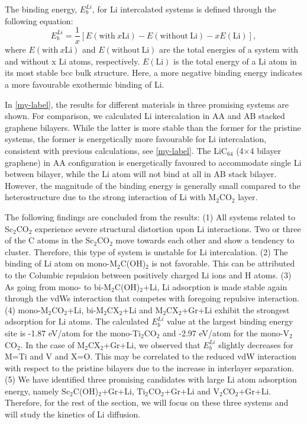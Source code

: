 The binding energy, $E_{b}^{Li}$, for Li intercalated systems is defined through the following equation:
\begin{equation}
E_{b}^{Li}=\frac{1}{x}[E(\mathrm{with~}x\mathrm{Li})-E(\mathrm{without~Li})-xE(\mathrm{Li})],
\end{equation}
where $E(\mathrm{with~}x\mathrm{Li})$ and $E(\mathrm{without~Li})$ are the total energies of a system with and without x Li atoms, respectively. $E(\mathrm{Li})$ is the total energy of a Li atom in its most stable bcc bulk structure. Here, a more negative binding energy indicates a more favourable exothermic binding of Li. 

In \autoref{my-label}, the results for different materials in three promising systems are shown. For comparison, we calculated Li intercalation in AA and AB stacked graphene bilayers. While the latter is more stable than the former for the pristine systems, the former is energetically more favourable for Li intercalation, consistent with previous calculations\cite{PhysRevB.93.245438}, see \autoref{my-label}.  The LiC$_{64}$ (4$\times$4 bilayer graphene) in AA configuration is energetically favoured to accommodate single Li between bilayer, while the Li atom will not bind at all in AB stack bilayer. However, the magnitude of the binding energy is generally small compared to the heterostructure due to the strong interaction of Li with M$_2$CO$_2$ layer.


The following findings are concluded from the results: 
(1) All systems related to Sc$_2$CO$_2$ experience severe structural distortion upon Li interactions. Two or three of the C atoms in the Sc$_2$CO$_2$ move towards each other and show a tendency to cluster. Therefore, this type of system is unstable for Li intercalation. 
(2) The binding of Li atom on mono-M$_2$C(OH)$_2$ is not favorable. This can be attributed to the Columbic repulsion between positively charged Li ions and H atoms. 
(3) As going from mono- to bi-M$_2$C(OH)$_2$+Li, Li adsorption is made stable again through the vdWs interaction that competes with foregoing repulsive interaction.  
(4) mono-M$_2$CO$_2$+Li,  bi-M$_2$CX$_2$+Li and M$_2$CX$_2$+Gr+Li exhibit the strongest adsorption for Li atoms. The calculated $E_{b}^{Li}$ value at the largest binding energy site is -1.87 eV/atom for the mono-Ti$_2$CO$_2$ and -2.97 eV/atom for the mono-V$_2$CO$_2$. In the case of M$_2$CX$_2$+Gr+Li, we observed that $E_{b}^{Li}$ slightly decreases for M=Ti and V and X=O.  This may be correlated to the reduced vdW interaction with respect to the pristine bilayers due to the increase in interlayer separation.  
(5) We have identified three promising candidates with large Li atom adsorption energy, namely Sc$_2$C(OH)$_2$+Gr+Li, Ti$_2$CO$_2$+Gr+Li and V$_2$CO$_2$+Gr+Li. Therefore, for the rest of the section, we will focus on these three systems and will study the kinetics of Li diffusion. 

